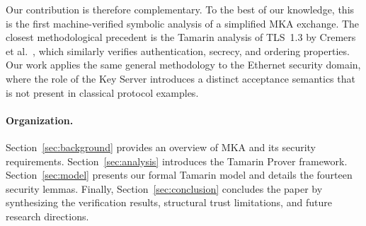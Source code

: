 Our contribution is therefore complementary. To the best of our knowledge, this is the first machine-verified symbolic analysis of a simplified MKA exchange. The closest methodological precedent is the Tamarin analysis of TLS~1.3 by Cremers et al.~\cite{cremers2017comprehensive}, which similarly verifies authentication, secrecy, and ordering properties. Our work applies the same general methodology to the Ethernet security domain, where the role of the Key Server introduces a distinct acceptance semantics that is not present in classical protocol examples.

\paragraph{Organization.} Section~\ref{sec:background} provides an overview of MKA and its security requirements. Section~\ref{sec:analysis} introduces the Tamarin Prover framework. Section~\ref{sec:model} presents our formal Tamarin model and details the fourteen security lemmas. Finally, Section~\ref{sec:conclusion} concludes the paper by synthesizing the verification results, structural trust limitations, and future research directions.


